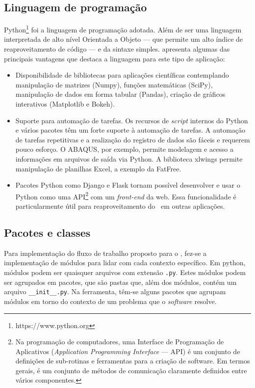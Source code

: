 \subsection{Linguagem de programação}\label{sec:python}

Python\footnote{https://www.python.org} foi a linguagem de programação adotada. Além de ser uma linguagem interpretada de alto nível Orientada a Objeto --- que permite um alto índice de reaproveitamento de código --- e da sintaxe simples.  apresenta algumas das principais vantagens que destaca a linguagem para este tipo de aplicação:

\begin{itemize}
    \item Disponibilidade de bibliotecas para aplicações científicas contemplando manipulação de matrizes (Numpy), funções matemáticas (SciPy), manipulação de dados em forma tabular (Pandas), criação de gráficos interativos (Matplotlib e Bokeh).

    \item Suporte para automação de tarefas. Os recursos de \textit{script} internos do Python e vários pacotes têm um forte suporte à automação de tarefas. A automação de tarefas repetitivas e a realização do registro de dados são fáceis e requerem pouco esforço. O ABAQUS, por exemplo, permite modelagem e acesso a informações em arquivos de saída via Python. A biblioteca xlwings permite manipulação de planilhas Excel, a exemplo da FatFree.

    \item Pacotes Python como Django e Flask tornam possível desenvolver e usar o Python como uma API\footnote{Na programação de computadores, uma Interface de Programação de Aplicativos (\textit{Application Programming Interface} --- API) é um conjunto de definições de sub-rotinas e ferramentas para a criação de software. Em termos gerais, é um conjunto de métodos de comunicação claramente definidos entre vários componentes.} com um \textit{front-end} da web. Essa funcionalidade é particularmente útil para reaproveitamento do \frame\  em outras aplicações.
\end{itemize}


\subsection{Pacotes e classes}


Para implementação do fluxo de trabalho proposto para o \frame, fez-se a implementação de módulos para lidar com cada contexto específico.
Em python, módulos podem ser quaisquer arquivos com extensão \texttt{.py}.
Estes módulos podem ser agrupados em pacotes, que são pastas que, além dos módulos, contém um arquivo \texttt{\_\_init\_\_.py}.  %
Na ferramenta, têm-se alguns pacotes que agrupam módulos em torno do contexto de um problema que o \textit{software} resolve.


